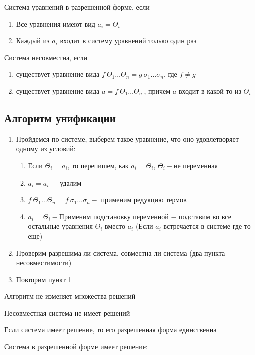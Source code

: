 		\begin{definition}Система уравнений в разрешенной форме, если \end{definition}
			\begin{enumerate}
				\item Все уравнения имеют вид $a_i=\Theta_i$
				\item Каждый из $a_i$ входит в систему уравнений только один раз
			\end{enumerate}
		\begin{definition}Система несовместна, если\end{definition}
		\begin{enumerate}
			\item существует уравнение вида $f\:\Theta_1\hdots\Theta_n=g\:\sigma_1\hdots\sigma_n$, где $f\neq g$
			\item существует уравнение вида $a=f\:\Theta_1\hdots\Theta_n\:$, причем $a$ входит в какой-то из $\Theta_i$
		\end{enumerate}			

    \subsection{ Алгоритм унификации}
		\begin{enumerate}
		\item Пройдемся по системе, выберем такое уравнение, что оно удовлетворяет одному из условий:\begin{enumerate}
			\item Если $\Theta_i=a_i$, то перепишем, как $a_i=\Theta_i$, $\Theta_i-$не переменная
			\item $a_i=a_i-$ удалим
			\item $f\:\Theta_1\hdots\Theta_n=f\:\sigma_1\hdots\sigma_n-$  применим редукцию термов 
			\item $a_i=\Theta_i-$Применим подстановку переменной $-$ подставим во все остальные уравнения $\Theta_i$ вместо $a_i$ (Если $a_i$ встречается в системе где-то еще)
		\end{enumerate}
		\item Проверим разрешима ли система, совместна ли система (два пункта несовместимости)
		\item Повторим пункт 1 		
		\end{enumerate}

		\begin{statement} Алгоритм не изменяет множества решений\end{statement}
		\begin{statement} Несовместная система не имеет решений\end{statement}
		\begin{statement} Если система имеет решение, то его разрешенная форма единственна\end{statement}
		\begin{statement} Система в разрешенной форме имеет решение:\end{statement}	
		
